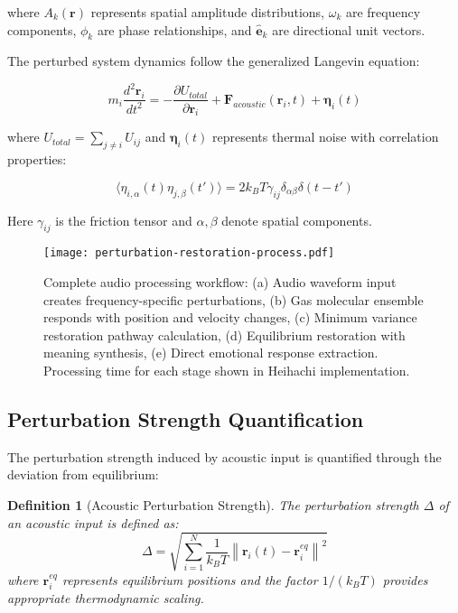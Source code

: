 \documentclass[12pt,a4paper]{article}
\newtheorem{definition}[theorem]{Definition}
\begin{document}
where $A_k(\mathbf{r})$ represents spatial amplitude distributions, $\omega_k$ are frequency components, $\phi_k$ are phase relationships, and $\hat{\mathbf{e}}_k$ are directional unit vectors.

The perturbed system dynamics follow the generalized Langevin equation:

\begin{equation}
m_i \frac{d^2\mathbf{r}_i}{dt^2} = -\frac{\partial U_{total}}{\partial \mathbf{r}_i} + \mathbf{F}_{acoustic}(\mathbf{r}_i, t) + \boldsymbol{\eta}_i(t)
\end{equation}

where $U_{total} = \sum_{j \neq i} U_{ij}$ and $\boldsymbol{\eta}_i(t)$ represents thermal noise with correlation properties:

\begin{equation}
\langle \eta_{i,\alpha}(t) \eta_{j,\beta}(t') \rangle = 2k_B T \gamma_{ij} \delta_{\alpha\beta} \delta(t-t')
\end{equation}

Here $\gamma_{ij}$ is the friction tensor and $\alpha, \beta$ denote spatial components.

\begin{figure}[h]
\centering
\texttt{[image: perturbation-restoration-process.pdf]}
\caption{Complete audio processing workflow: (a) Audio waveform input creates frequency-specific perturbations, (b) Gas molecular ensemble responds with position and velocity changes, (c) Minimum variance restoration pathway calculation, (d) Equilibrium restoration with meaning synthesis, (e) Direct emotional response extraction. Processing time for each stage shown in Heihachi implementation.}
\label{fig:processing_workflow}
\end{figure}

\subsection{Perturbation Strength Quantification}

The perturbation strength induced by acoustic input is quantified through the deviation from equilibrium:

\begin{definition}[Acoustic Perturbation Strength]
The perturbation strength $\Delta$ of an acoustic input is defined as:
\begin{equation}
\Delta = \sqrt{\sum_{i=1}^{N} \frac{1}{k_B T} \left\| \mathbf{r}_i(t) - \mathbf{r}_i^{eq} \right\|^2}
\end{equation}
where $\mathbf{r}_i^{eq}$ represents equilibrium positions and the factor $1/(k_B T)$ provides appropriate thermodynamic scaling.
\end{definition}
\end{document}

